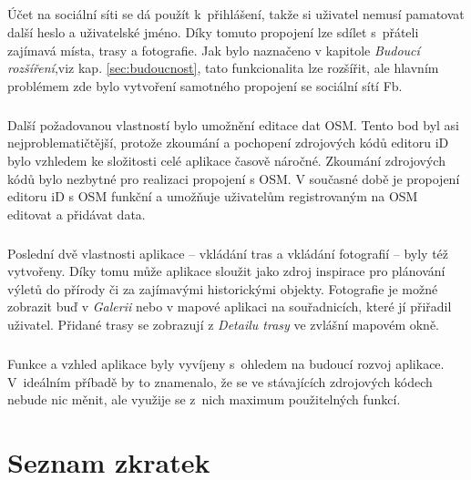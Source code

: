 \documentclass[11pt,a4paper,titlepage,oneside]{book}
\begin{document}
			\paragraph {}Účet na sociální síti se dá použít k~přihlášení, takže si uživatel nemusí pamatovat další heslo a uživatelské jméno. Díky tomuto propojení lze sdílet s~přáteli zajímavá místa, trasy a fotografie. Jak bylo naznačeno v kapitole \textit{Budoucí rozšíření},viz kap. \ref{sec:budoucnost}, tato funkcionalita lze rozšířit, ale hlavním problémem zde bylo vytvoření samotného propojení se sociální sítí \acl{Fb}.
			\paragraph{}Další požadovanou vlastností bylo umožnění editace dat \ac{OSM}. Tento bod byl asi nejproblematičtější, protože zkoumání a pochopení zdrojových kódů editoru iD bylo vzhledem ke složitosti celé aplikace časově náročné. Zkoumání zdrojových kódů bylo nezbytné pro realizaci propojení s \acl{OSM}. V současné době je propojení editoru iD s \acl{OSM} funkční a umožňuje uživatelům registrovaným na \ac{OSM} editovat a přidávat data.
			\paragraph{} Poslední dvě vlastnosti aplikace -- vkládání tras a vkládání fotografií -- byly též vytvořeny. Díky tomu může aplikace sloužit jako zdroj inspirace pro plánování výletů do přírody či za zajímavými historickými objekty. Fotografie je možné zobrazit buď v \textit{Galerii} nebo v mapové aplikaci na souřadnicích, které jí přiřadil uživatel. Přidané trasy se zobrazují z \textit{Detailu trasy} ve zvlášní mapovém okně.
			\paragraph{} Funkce a vzhled aplikace byly vyvíjeny s~ohledem na budoucí rozvoj aplikace. V~ideálním příbadě by to znamenalo, že se ve stávajících zdrojových kódech nebude nic měnit, ale využije se z~nich maximum použitelných funkcí.


\newpage 
\chapter*{Seznam zkratek}

\end{document}

